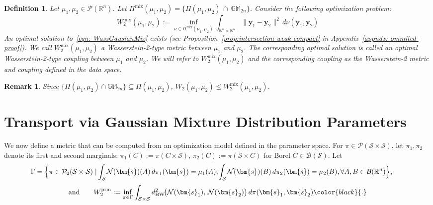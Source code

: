 \documentclass[opre,sglanonrev]{informs4}
\newtheorem{definition}{Definition}
\newtheorem{remark}{Remark}
\newcommand{\mS}{\mathcal{S}}
\newcommand{\mN}{\mathcal{N}}
\newcommand{\mP}{\mathcal{P}}
\newcommand{\mB}{\mathcal{B}}
\newcommand{\mbR}{\mathbb R}
\newcommand{\mbGM}{\mathbb{GM}}
\newcommand{\bs}{\bm{s}}
\newcommand{\by}{\bm{y}}
\newcommand{\srevision}[1]{{\color{black}{#1}}}
\begin{document}
\begin{definition} Let $\mu_1, \mu_2 \in \mP(\mbR^n)$. Let $\Pi^\mathrm{mix}(\mu_1, \mu_2) = \{\Pi(\mu_1, \mu_2)\, \cap\  \mbGM_{2n}\}$. Consider the following optimization problem:
\begin{equation}
    W_2^\mathrm{mix}(\mu_1,\mu_2) := \inf_{\nu \in \Pi^\mathrm{mix}(\mu_1, \mu_2)}
    \int_{\mbR^n \times \mbR^n}
      \|\by_1 - \by_2\|^2 \,d\nu(\by_1,\by_2) \label{eqn: WassGausianMix}
\end{equation}
An optimal solution to~\eqref{eqn: WassGausianMix} exists (see Proposition~\ref{prop:intersection-weak-compact} in Appendix~\ref{appndx: ommited-proof}). We call $W_2^\mathrm{mix}(\mu_1,\mu_2)$ a Wasserstein-2-type metric between $\mu_1$ and $\mu_2$. The corresponding optimal solution is called an optimal Wasserstein-2-type coupling between $\mu_1$ and $\mu_2$. We will refer to $W_2^{\mathrm{mix}}(\mu_1,\mu_2)$  and the corresponding coupling as the Wasserstein-2 metric and coupling defined in the data space.
\end{definition}
\begin{remark}
Since $\{\Pi(\mu_1,\mu_2)\cap \mbGM_{2n} \} \subseteq \Pi(\mu_1,\mu_2)$,  $W_2(\mu_1,\mu_2) \leq W_2^{\mathrm{mix}}(\mu_1,\mu_2)$.  
\end{remark}
\section{Transport via Gaussian Mixture Distribution Parameters} 
\label{sec: WassersteinTypeTransportEquivalence}

We now define a metric that can be computed from an optimization model defined in the parameter space. For $\pi \in \mP(\mS \times \mS)$, let $\pi_1,\pi_2$ denote its first and second marginals:
$\pi_1(C) := \pi(C \times \mS)$, $\pi_2(C) := \pi(\mS \times C)$ for Borel $C \in \mB(\mS)$. Let
\begin{align}\label{def: coupling-param}
\hspace{-1.75em}\Gamma = 
  \Bigl\{
    \pi \in \mP_2(\mS \times \mS)
    \mid \hspace{-1pt}
   \int_{\mathcal{S}} \hspace{-1pt} \mN(\bs)(A)\,d\pi_1(\bs) = \mu_1(A),\hspace{-1pt}
   \int_{\mathcal{S}} \hspace{-1pt} \mN(\bs)(B)\,d\pi_2(\bs) = \mu_2(B), \forall A, B \in \mB{(\mbR^n)}
  \Bigr\}, 
\end{align}
\vspace{-1.0em}
\begin{equation}
\text{and} \qquad    W_2^\mathrm{prm} := \inf_{\pi\in\Gamma}
    \int_{\mS\times \mS} 
d^2_{\mathrm{BW}}\!\bigl(\mN(\bs_1),\,\mN(\bs_2)\bigr)\,d\pi(\bs_1, \bs_2)\srevision{.}\label{eqn:Wass2ParamSpace}
\end{equation}
\end{document}
